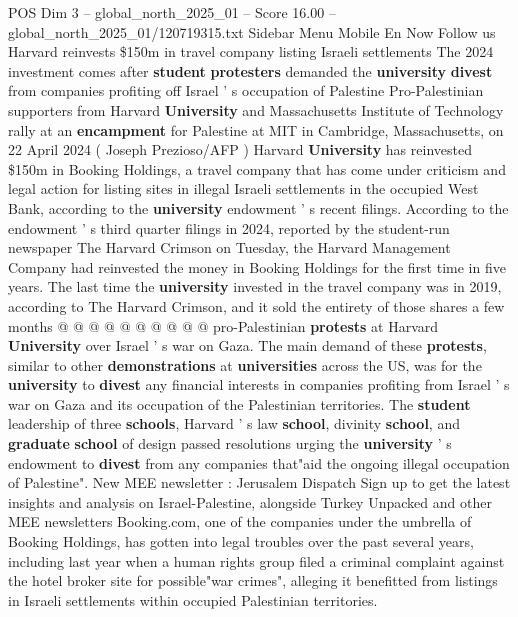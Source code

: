 \begin{textsample}{POS Dim 3 – global\_north\_2025\_01 – Score 16.00 – global\_north\_2025\_01/120719315.txt}  \label{ex:f3_pos_245}
Sidebar Menu Mobile En Now Follow us Harvard reinvests \$150m in travel company listing Israeli settlements The 2024 investment comes after \textbf{student} \textbf{protesters} demanded the \textbf{university} \textbf{divest} from companies profiting off Israel ' s occupation of Palestine Pro-Palestinian supporters from Harvard \textbf{University} and Massachusetts Institute of Technology rally at an \textbf{encampment} for Palestine at MIT in Cambridge, Massachusetts, on 22 April 2024 ( Joseph Prezioso/AFP ) Harvard \textbf{University} has reinvested \$150m in Booking Holdings, a travel company that has come under criticism and legal action for listing sites in illegal Israeli settlements in the occupied West Bank, according to the \textbf{university} endowment ' s recent filings.
According to the endowment ' s third quarter filings in 2024, reported by the student-run newspaper The Harvard Crimson on Tuesday, the Harvard Management Company had reinvested the money in Booking Holdings for the first time in five years.
The last time the \textbf{university} invested in the travel company was in 2019, according to The Harvard Crimson, and it sold the entirety of those shares a few months @ @ @ @ @ @ @ @ @ @ pro-Palestinian \textbf{protests} at Harvard \textbf{University} over Israel ' s war on Gaza.
The main demand of these \textbf{protests}, similar to other \textbf{demonstrations} at \textbf{universities} across the US, was for the \textbf{university} to \textbf{divest} any financial interests in companies profiting from Israel ' s war on Gaza and its occupation of the Palestinian territories.
The \textbf{student} leadership of three \textbf{schools}, Harvard ' s law \textbf{school}, divinity \textbf{school}, and \textbf{graduate} \textbf{school} of design passed resolutions urging the \textbf{university} ' s endowment to \textbf{divest} from any companies that"aid the ongoing illegal occupation of Palestine".
New MEE newsletter : Jerusalem Dispatch Sign up to get the latest insights and analysis on Israel-Palestine, alongside Turkey Unpacked and other MEE newsletters Booking.com, one of the companies under the umbrella of Booking Holdings, has gotten into legal troubles over the past several years, including last year when a human rights group filed a criminal complaint against the hotel broker site for possible"war crimes", alleging it benefitted from listings in Israeli settlements within occupied Palestinian territories.

\end{textsample}
